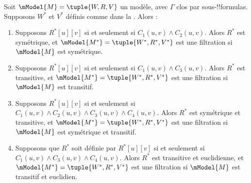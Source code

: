 \documentclass[../../../include/open-logic-section]{subfiles}
\begin{document}
\begin{thm}
  Soit $\mModel{M} =\tuple{W,R,V}$ un modèle, avec $\Gamma$ clos
  par sous-!!{formula}s. Supposons $W^*$ et $V^*$ définis comme dans la
  . Alors :
  \begin{enumerate}
  \item Supposons $R^*[u][v]$ si et seulement si $C_1(u, v) \land
    C_2(u,v)$. Alors $R^*$ est symétrique, et $\mModel{M^*} =
    \tuple{W^*,R^*,V^*}$ est une filtration si $\mModel{M}$ est
    symétrique.
  \item Supposons $R^*[u][v]$ si et seulement si $C_1(u, v)
    \land C_3(u,v)$. Alors $R^*$ est transitive, et
    $\mModel{M^*}=\tuple{W^*,R^*,V^*}$ est une filtration si
    $\mModel{M}$ est transitif.
  \item Supposons $R^*[u][v]$ si et seulement si $C_1(u, v) \land C_2(u,v)
    \land C_3(u,v) \land C_4(u,v)$. Alors $R^*$ est symétrique et
    transitive, et $\mModel{M^*}=\tuple{W^*,R^*,V^*}$ est une
    filtration si $\mModel{M}$ est symétrique et transitif.
  \item Supposons que $R^*$ soit définie par $R^*[u][v]$ si et
    seulement si $C_1(u,
    v) \land C_3(u,v) \land C_4(u,v)$. Alors $R^*$ est transitive et
    euclidienne, et $\mModel{M^*}=\tuple{W^*,R^*,V^*}$ est une
    filtration si $\mModel{M}$ est transitif et euclidien.
  \end{enumerate}
\end{thm}
\end{document}
